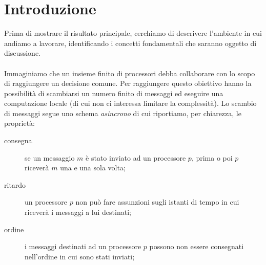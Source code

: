\documentclass{article}
\begin{document}
\title{\rmfamily\normalfont{}}
\author{\\
	\\
	}
\date{} %

\maketitle


\begin{abstract}
  In questo lavoro ci proponiamo di studiare il risultato di
  impossilit\`a del consenso in un sistema totalmente asincrono,
  dimostrato da Fischer, Lynch e Paterson nel 1985.

  Nella nostra esposizione intendiamo riportare i principali risultati
  raggiunti dagli autori, integrando alcuni dettagli con brevi
  interventi che abbiamo sviluppato durante lo studio.

  Questo nostro elaborato \`e diviso in due macro sezioni: la prima ha
  un taglio pi\`u teorico e tratta la prova d'impossibilit\`a; la
  seconda, invece, ha un taglio pi\`u implementativo e propone uno
  schema per risolvere il problema del consenso, aggiungendo alcune
  ipotesi.
\end{abstract}
       
\tableofcontents

\section{Introduzione}
\label{sec:intro}
Prima di mostrare il risultato principale, cerchiamo di descrivere
l'ambiente in cui andiamo a lavorare, identificando i concetti
fondamentali che saranno oggetto di discussione.\\\\
Immaginiamo che un insieme finito di processori debba collaborare con
lo scopo di raggiungere un decisione comune. Per raggiungere questo
obiettivo hanno la possibilit\`a di scambiarsi un numero finito di
messaggi ed eseguire una computazione locale (di cui non ci interessa
limitare la complessit\`a). Lo scambio di messaggi segue uno schema
\emph{asincrono} di cui riportiamo, per chiarezza, le propriet\`a:
\begin{description}
\item[consegna] se un messaggio $m$ \`e stato inviato ad un processore
  $p$, prima o poi $p$ ricever\`a $m$ una e una sola volta;
\item[ritardo] un processore $p$ non pu\`o fare assunzioni sugli
  istanti di tempo in cui ricever\`a i messaggi a lui destinati;
\item[ordine] i messaggi destinati ad un processore $p$ possono non
  essere consegnati nell'ordine in cui sono stati inviati;
\end{description}
\end{document}
